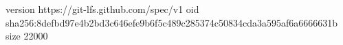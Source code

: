 version https://git-lfs.github.com/spec/v1
oid sha256:8defbd97e4b2bd3c646efe9b6f5c489c285374c50834cda3a595af6a6666631b
size 22000
